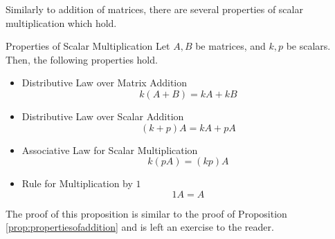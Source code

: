 Similarly to addition of matrices, there are several properties of scalar multiplication which hold.

\begin{proposition}{Properties of Scalar Multiplication}\label{prop:propertiesscalarmult}
Let $A, B$ be matrices, and $k, p$ be scalars. Then, the following properties  hold.
\begin{itemize}
\item Distributive Law over Matrix Addition
\begin{equation*}
k \left( A+B\right) =k A+ kB  
\end{equation*}

\item Distributive Law over Scalar Addition
\begin{equation*}
\left( k +p \right) A= k A+p A
\end{equation*}

\item Associative Law for Scalar Multiplication
\begin{equation*}
k \left( p A\right) = \left( k p \right) A 
\end{equation*}

\item Rule for Multiplication by $1$
\begin{equation*}
1A=A  
\end{equation*}
\end{itemize}

\end{proposition}

The proof of this proposition is similar to the proof of Proposition \ref{prop:propertiesofaddition} and is left an exercise to the reader.